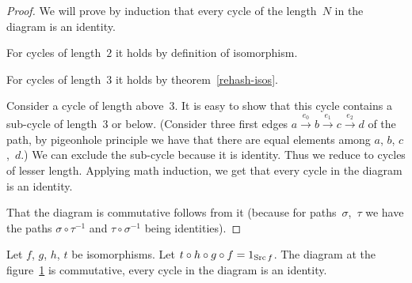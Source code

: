 \begin{proof}
We will prove by induction that every cycle of the length~$N$ in
the diagram is an identity.

For cycles of length~$2$ it holds by definition of isomorphism.

For cycles of length~$3$ it holds by theorem~\ref{rehash-isos}.

Consider a cycle of length above~$3$. It is easy to show that this
cycle contains a sub-cycle of length~$3$ or below. (Consider three
first edges $a\overset{e_{0}}{\rightarrow}b\overset{e_{1}}{\rightarrow}c\overset{e_{2}}{\rightarrow}d$
of the path, by pigeonhole principle we have that there are equal
elements among $a$, $b$, $c$,~$d$.) We can exclude the sub-cycle
because it is identity. Thus we reduce to cycles of lesser length.
Applying math induction, we get that every cycle in the diagram is
an identity.

That the diagram is commutative follows from it (because for paths~$\sigma$,~$\tau$
we have the paths $\sigma\circ\tau^{-1}$ and $\tau\circ\sigma^{-1}$
being identities).\end{proof}
\begin{lem}
\label{four-loop-lem}Let $f$, $g$, $h$, $t$ be isomorphisms.
Let $t\circ h\circ g\circ f=1_{\operatorname{Src} f}$. The diagram at the figure~\ref{four-loop}
is commutative, every cycle in the diagram is an identity.

\begin{figure}[ht]
\caption{\label{four-loop}}
\end{figure}
\end{lem}
